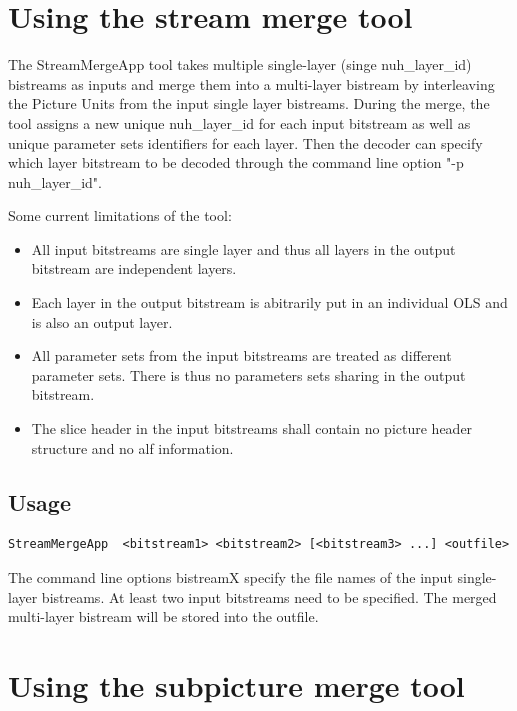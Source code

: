 \documentclass[a4paper,11pt]{jvetdoc}
\begin{document}
\section{Using the stream merge tool}
\label{sec:stream-merge-tool}

The StreamMergeApp tool takes multiple single-layer (singe nuh_layer_id) bistreams 
as inputs and merge them into a multi-layer bistream by interleaving the Picture Units
from the input single layer bistreams. During the merge, the tool assigns a new unique
nuh_layer_id for each input bitstream as well as unique parameter sets identifiers for each layer.
Then the decoder can specify which layer bitstream to be decoded through the command line option "-p nuh_layer_id".

Some current limitations of the tool:
\begin{itemize}
\item All input bitstreams are single layer and thus all layers in the output bitstream are independent layers.
\item Each layer in the output bitstream is abitrarily put in an individual OLS and is also an output layer.
\item All parameter sets from the input bitstreams are treated as different parameter sets. There is thus no parameters sets sharing in the output bitstream.
\item The slice header in the input bitstreams shall contain no picture header structure and no alf information.
\end{itemize}


\subsection{Usage}
\label{sec:stream-merge-usage}

\begin{verbatim}
StreamMergeApp 	<bitstream1> <bitstream2> [<bitstream3> ...] <outfile>
\end{verbatim}

The command line options bistreamX specify the file names of the input single-layer 
bistreams. At least two input bitstreams need to be specified. The merged multi-layer 
bistream will be stored into the outfile.




\section{Using the subpicture merge tool}
\label{sec:subpicture-merge-tool}
\end{document}

